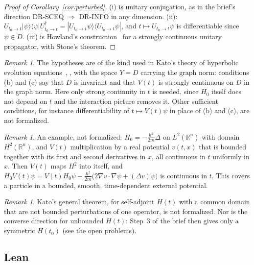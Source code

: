 \documentclass[11pt]{article}
\theoremstyle{definition}
\theoremstyle{remark}
\newtheorem{remark}[theorem]{Remark}
\begin{document}
\begin{proof}[Proof of Corollary~\ref{cor:perturbed}]
  (i) is unitary conjugation, as in the brief's direction DR-SCEQ $\Rightarrow$ DR-INFO in any
  dimension. (ii): $U_{t_0\to t}|\psi\rangle\langle\psi|U_{t_0\to t}^\dagger =
  |U_{t_0\to t}\psi\rangle\langle U_{t_0\to t}\psi|$, and $t\mapsto U_{t_0\to t}\psi$ is
  differentiable since $\psi\in D$. (iii) is Howland's construction~\cite{howland} for a strongly
  continuous unitary propagator, with Stone's theorem.
\end{proof}

\begin{remark}
  The hypotheses are of the kind used in Kato's theory of hyperbolic evolution
  equations~\cite{kato}, \cite[Ch.~5]{pazy}, with the space $Y = D$ carrying the graph norm:
  conditions (b) and (c) say that $D$ is invariant and that $V(t)$ is strongly continuous on $D$
  in the graph norm. Here only strong continuity in $t$ is needed, since $H_0$ itself does not
  depend on $t$ and the interaction picture removes it. Other sufficient conditions, for
  instance differentiability of $t\mapsto V(t)\psi$ in place of (b) and (c), are not
  formalized.
\end{remark}

\begin{remark}
  An example, not formalized: $H_0 = -\frac{\hbar^2}{2m}\Delta$ on $L^2(\mathbb R^n)$ with
  domain $H^2(\mathbb R^n)$, and $V(t)$ multiplication by a real potential $v(t, x)$ that is
  bounded together with its first and second derivatives in $x$, all continuous in $t$
  uniformly in $x$. Then $V(t)$ maps $H^2$ into itself, and $H_0V(t)\psi = V(t)H_0\psi -
  \frac{\hbar^2}{2m}\bigl(2\nabla v\cdot\nabla\psi + (\Delta v)\psi\bigr)$ is continuous in $t$.
  This covers a particle in a bounded, smooth, time-dependent external potential.
\end{remark}

\begin{remark}
  Kato's general theorem, for self-adjoint $H(t)$ with a common domain that are not bounded
  perturbations of one operator, is not formalized. Nor is the converse direction for unbounded
  $H(t)$: Step~3 of the brief then gives only a symmetric $H(t_0)$ (see the open problems).
\end{remark}

\subsection{Lean}
\end{document}
